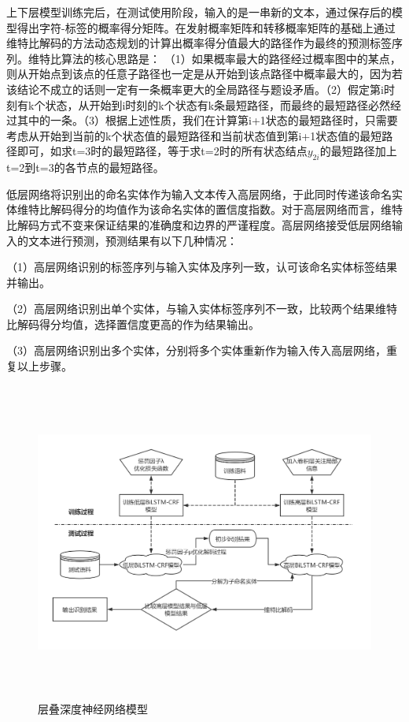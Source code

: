 \documentclass[winfonts,master,oneside,nobackinfo]{njuthesis}
\begin{document}
上下层模型训练完后，在测试使用阶段，输入的是一串新的文本，通过保存后的模型得出字符-标签的概率得分矩阵。在发射概率矩阵和转移概率矩阵的基础上通过维特比解码的方法动态规划的计算出概率得分值最大的路径作为最终的预测标签序列。维特比算法的核心思路是： （1）如果概率最大的路径经过概率图中的某点，则从开始点到该点的任意子路径也一定是从开始到该点路径中概率最大的，因为若该结论不成立的话则一定有一条概率更大的全局路径与题设矛盾。（2）假定第i时刻有k个状态，从开始到i时刻的k个状态有k条最短路径，而最终的最短路径必然经过其中的一条。（3）根据上述性质，我们在计算第i+1状态的最短路径时，只需要考虑从开始到当前的k个状态值的最短路径和当前状态值到第i+1状态值的最短路径即可，如求t=3时的最短路径，等于求t=2时的所有状态结点$y_{2i}$的最短路径加上t=2到t=3的各节点的最短路径。

低层网络将识别出的命名实体作为输入文本传入高层网络，于此同时传递该命名实体维特比解码得分的均值作为该命名实体的置信度指数。对于高层网络而言，维特比解码方式不变来保证结果的准确度和边界的严谨程度。高层网络接受低层网络输入的文本进行预测，预测结果有以下几种情况：

（1）高层网络识别的标签序列与输入实体及序列一致，认可该命名实体标签结果并输出。

（2）高层网络识别出单个实体，与输入实体标签序列不一致，比较两个结果维特比解码得分均值，选择置信度更高的作为结果输出。

（3）高层网络识别出多个实体，分别将多个实体重新作为输入传入高层网络，重复以上步骤。



\begin{figure}[H]
\centering
\begin{minipage}[t]{\textwidth}
\includegraphics[width=1.1\textwidth,height=10.5cm]{./figure/层叠模型流程.jpg}
\caption{层叠深度神经网络模型}
\label{lab:1}
\end{minipage}
\end{figure}
\end{document}
